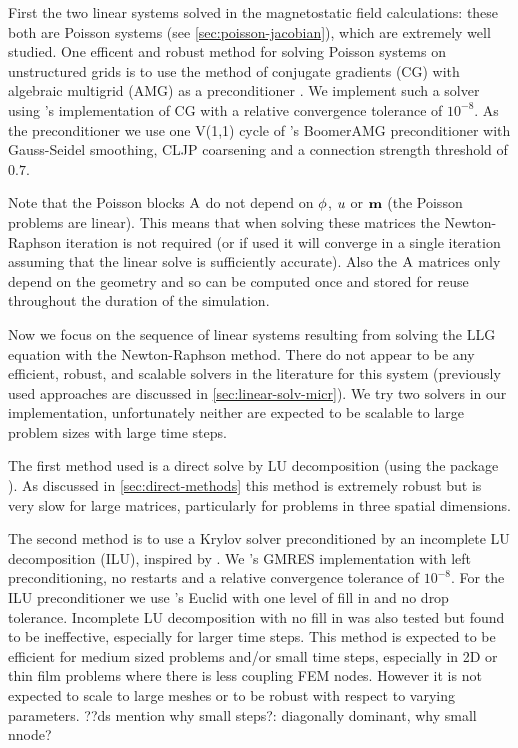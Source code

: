 First the two linear systems solved in the magnetostatic field calculations: these both are Poisson systems (see \cref{sec:poisson-jacobian}), which are extremely well studied.
One efficent and robust method for solving Poisson systems on unstructured grids is to use the method of conjugate gradients (CG) with algebraic multigrid (AMG) as a preconditioner \cite[Chap. 2]{HowardElmanDavidSilvester2006}.
We implement such a solver using \oomph's implementation of CG with a relative convergence tolerance of $10^{-8}$.
As the preconditioner we use one V(1,1) cycle of \hypre's BoomerAMG preconditioner \cite{hypre} with Gauss-Seidel smoothing, CLJP coarsening and a connection strength threshold of $0.7$.

Note that the Poisson blocks $\mathrm{A}$ do not depend on $\phi$, $u$ or $\boldsymbol{\mathrm{m}}$ (\ie the Poisson problems are linear).
This means that when solving these matrices the Newton-Raphson iteration is not required (or if used it will converge in a single iteration assuming that the linear solve is sufficiently accurate).
Also the $\mathrm{A}$ matrices only depend on the geometry and so can be computed once and stored for reuse throughout the duration of the simulation.


Now we focus on the sequence of linear systems resulting from solving the LLG equation with the Newton-Raphson method.
There do not appear to be any efficient, robust, and scalable solvers in the literature for this system (previously used approaches are discussed in \cref{sec:linear-solv-micr}).
We try two solvers in our implementation, unfortunately neither are expected to be scalable to large problem sizes with large time steps.

The first method used is a direct solve by LU decomposition (using the \superlu package \cite{superlu}).
As discussed in \cref{sec:direct-methods} this method is extremely robust but is very slow for large matrices, particularly for problems in three spatial dimensions.

The second method is to use a Krylov solver preconditioned by an incomplete LU decomposition (ILU), inspired by \cite{Suess2002}.
We \oomph's GMRES implementation with left preconditioning, no restarts and a relative convergence tolerance of $10^{-8}$.
For the ILU preconditioner we use \hypre's Euclid with one level of fill in and no drop tolerance.
Incomplete LU decomposition with no fill in was also tested but found to be ineffective, especially for larger time steps.
This method is expected to be efficient for medium sized problems and/or small time steps, especially in 2D or thin film problems where there is less coupling FEM nodes.
However it is not expected to scale to large meshes or to be robust with respect to varying parameters.
??ds mention why small steps?: diagonally dominant, why small nnode?


